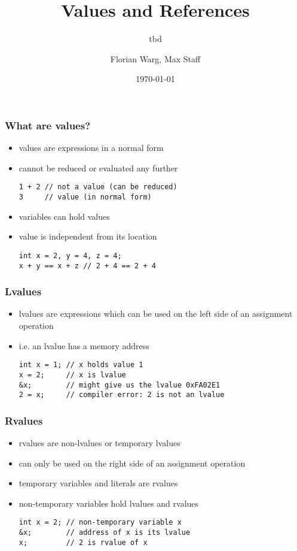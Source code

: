 



\title{Values and References}
\subtitle{tbd}
\date{\today}
\author{Florian Warg, Max Staff}

\maketitle

\begin{frame}[fragile]
    \frametitle{What are values?}
    \begin{itemize}
        \item values are expressions in a normal form
        \item cannot be reduced or evaluated any further
        \begin{lstlisting}[numbers=none]
1 + 2 // not a value (can be reduced)
3     // value (in normal form)
        \end{lstlisting}
        \item variables can hold values
        \item value is independent from its location
        \begin{lstlisting}[numbers=none]
int x = 2, y = 4, z = 4;
x + y == x + z // 2 + 4 == 2 + 4
        \end{lstlisting}
    \end{itemize}
\end{frame}

\begin{frame}[fragile]
    \frametitle{Lvalues}
    \begin{itemize}
        \item lvalues are expressions which can be used on the left side of an assignment operation
        \item i.e. an lvalue has a memory address
        \begin{lstlisting}[numbers=none]
int x = 1; // x holds value 1
x = 2;     // x is lvalue
&x;        // might give us the lvalue 0xFA02E1
2 = x;     // compiler error: 2 is not an lvalue
        \end{lstlisting}
    \end{itemize}
\end{frame}

\begin{frame}[fragile]
    \frametitle{Rvalues}
    \begin{itemize}
        \item rvalues are non-lvalues or temporary lvalues
        \item can only be used on the right side of an assignment operation
        \item temporary variables and literals are rvalues
        \item non-temporary variables hold lvalues and rvalues
        \begin{lstlisting}[numbers=none]
int x = 2; // non-temporary variable x
&x;        // address of x is its lvalue
x;         // 2 is rvalue of x
        \end{lstlisting}
    \end{itemize}
\end{frame}

